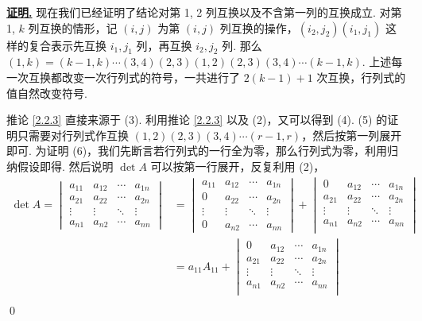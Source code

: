 \documentclass[10pt,openany]{article}
\theoremstyle{thmstyle} %
\theoremstyle{defstyle} %
\theoremstyle{prostyle} %
\theoremstyle{exastyle}
\theoremstyle{remstyle}
\renewenvironment{proof}[1][证明]{\par\underline{\textbf{#1.}} \;\fangsong}{\qed\par}
\begin{document}
\begin{proof}
     现在我们已经证明了结论对第 1, 2 列互换以及不含第一列的互换成立. 对第 1, \( k \) 列互换的情形，记 \( (i,j) \) 为第 \( (i,j) \) 列互换的操作，\( (i_2,j_2)(i_1,j_1) \) 这样的复合表示先互换 \( i_1,j_1 \) 列，再互换 \( i_2,j_2 \) 列. 那么 \( (1,k)=(k-1,k)\cdots(3,4)(2,3)(1,2)(2,3)(3,4)\cdots(k-1,k) \). 上述每一次互换都改变一次行列式的符号，一共进行了 \( 2(k-1)+1 \) 次互换，行列式的值自然改变符号.
     
     推论 \ref{2.2.3} 直接来源于 (3). 利用推论 \ref{2.2.3} 以及 (2)，又可以得到 (4). (5) 的证明只需要对行列式作互换 \( (1,2)(2,3)(3,4)\cdots(r-1,r) \)，然后按第一列展开即可. 为证明 (6)，我们先断言若行列式的一行全为零，那么行列式为零，利用归纳假设即得. 然后说明 \( \det A \) 可以按第一行展开，反复利用 (2)，
     \begin{align*}
     	\det A= \begin{vmatrix}
     		a_{11} & a_{12} & \cdots & a_{1n} \\
     		a_{21} & a_{22} & \cdots & a_{2n} \\
     		\vdots & \vdots & \ddots & \vdots \\
     		a_{n1} & a_{n2} & \cdots & a_{nn}
     	\end{vmatrix} &=  \begin{vmatrix}
     	a_{11} & a_{12} & \cdots & a_{1n} \\
     	0 & a_{22} & \cdots & a_{2n} \\
     	\vdots & \vdots & \ddots & \vdots \\
     	0 & a_{n2} & \cdots & a_{nn}
     	\end{vmatrix}+ \begin{vmatrix}
     	0 & a_{12} & \cdots & a_{1n} \\
     	a_{21} & a_{22} & \cdots & a_{2n} \\
     	\vdots & \vdots & \ddots & \vdots \\
     	a_{n1} & a_{n2} & \cdots & a_{nn} \\
     \end{vmatrix} \\
     	&= a_{11}A_{11}+\begin{vmatrix}
     		0 & a_{12} & \cdots & a_{1n} \\
     		a_{21} & a_{22} & \cdots & a_{2n} \\
     		\vdots & \vdots & \ddots & \vdots \\
     		a_{n1} & a_{n2} & \cdots & a_{nn} \\
     	\end{vmatrix} \\

\end{align*}
\end{proof}
\end{document}
